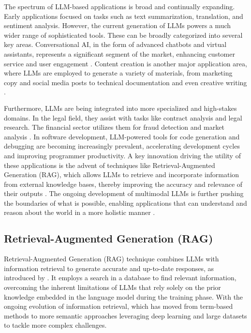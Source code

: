         The spectrum of LLM-based applications is broad and continually expanding. Early applications focused on tasks such as text summarization, translation, and sentiment analysis. However, the current generation of LLMs powers a much wider range of sophisticated tools. These can be broadly categorized into several key areas. Conversational AI, in the form of advanced chatbots and virtual assistants, represents a significant segment of the market, enhancing customer service and user engagement \citep{GrandViewResearch2025}. Content creation is another major application area, where LLMs are employed to generate a variety of materials, from marketing copy and social media posts to technical documentation and even creative writing \citep{V7Labs2025}.
        
        
        Furthermore, LLMs are being integrated into more specialized and high-stakes domains. In the legal field, they assist with tasks like contract analysis and legal research. The financial sector utilizes them for fraud detection and market analysis \citep{V7Labs2025}. In software development, LLM-powered tools for code generation and debugging are becoming increasingly prevalent, accelerating development cycles and improving programmer productivity. A key innovation driving the utility of these applications is the advent of techniques like Retrieval-Augmented Generation (RAG), which allows LLMs to retrieve and incorporate information from external knowledge bases, thereby improving the accuracy and relevance of their outputs \citep{KeywordsAI2025}. The ongoing development of multimodal LLMs is further pushing the boundaries of what is possible, enabling applications that can understand and reason about the world in a more holistic manner \citep{Kaddour2023}.
        
        \subsection{Retrieval-Augmented Generation (RAG)} 

            Retrieval-Augmented Generation (RAG) technique combines LLMs with information retrieval to generate accurate and up-to-date responses, as introduced by \citet{Lewis2020}. 
            It employs a search in a database to find relevant information, overcoming the inherent limitations of LLMs that rely solely on the prior knowledge embedded in the language model during the training phase. 
            With the ongoing evolution of information retrieval, which has moved from term-based methods to more semantic approaches leveraging deep learning and large datasets to tackle more complex challenges.
            

